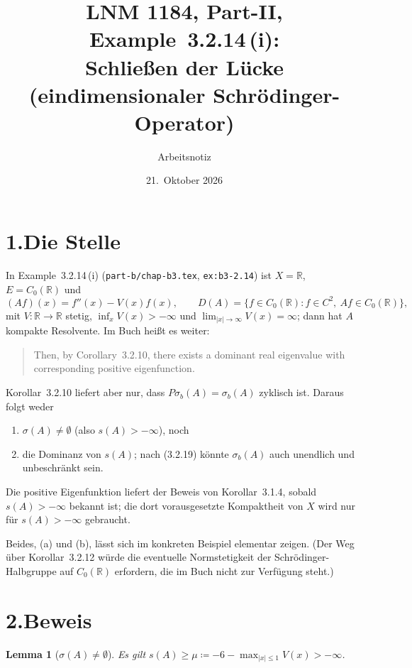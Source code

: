 \documentclass[11pt,a4paper]{article}
\title{LNM 1184, Part-II, Example~3.2.14\,(i):\\ Schließen der Lücke (eindimensionaler Schrödinger-Operator)}
\author{Arbeitsnotiz}
\date{21.~Oktober 2026}
\theoremstyle{plain}
\newtheorem{lemma}{Lemma}
\theoremstyle{remark}
\newcommand{\R}{\mathbb{R}}
\begin{document}
\maketitle

\section*{1.\quad Die Stelle}

In Example~3.2.14\,(i) (\texttt{part-b/chap-b3.tex}, \texttt{ex:b3-2.14}) ist $X = \R$, $E = C_0(\R)$ und
\[
  (Af)(x) = f''(x) - V(x)f(x), \qquad D(A) = \{f \in C_0(\R) \colon f \in C^2,\ Af \in C_0(\R)\},
\]
mit $V \colon \R \to \R$ stetig, $\inf_x V(x) > -\infty$ und $\lim_{|x|\to\infty} V(x) = \infty$; dann hat $A$ kompakte Resolvente. Im Buch heißt es weiter:

\begin{quote}
Then, by Corollary~3.2.10, there exists a dominant real eigenvalue with corresponding positive eigenfunction.
\end{quote}

Korollar~3.2.10 liefert aber nur, dass $P\sigma_b(A) = \sigma_b(A)$ zyklisch ist. Daraus folgt weder
\begin{enumerate}[label=(\alph*)]
\item $\sigma(A) \neq \emptyset$ (also $s(A) > -\infty$), noch
\item die Dominanz von $s(A)$; nach (3.2.19) könnte $\sigma_b(A)$ auch unendlich und unbeschränkt sein.
\end{enumerate}
Die positive Eigenfunktion liefert der Beweis von Korollar~3.1.4, sobald $s(A) > -\infty$ bekannt ist; die dort vorausgesetzte Kompaktheit von $X$ wird nur für $s(A) > -\infty$ gebraucht.

Beides, (a) und (b), lässt sich im konkreten Beispiel elementar zeigen. (Der Weg über Korollar~3.2.12 würde die eventuelle Normstetigkeit der Schrödinger-Halbgruppe auf $C_0(\R)$ erfordern, die im Buch nicht zur Verfügung steht.)

\section*{2.\quad Beweis}

\begin{lemma}[$\sigma(A) \neq \emptyset$]\label{lem:a}
Es gilt $s(A) \geq \mu \coloneq -6 - \max_{|x| \leq 1} V(x) > -\infty$.
\end{lemma}
\end{document}
